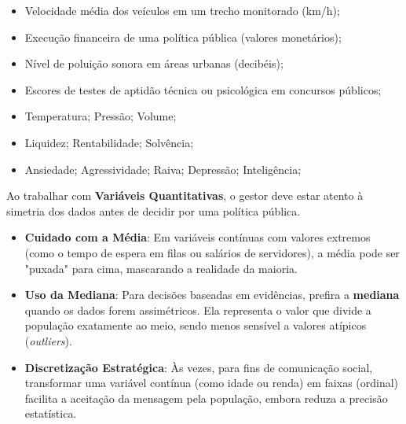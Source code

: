 \begin{enumerate}
\begin{itemize}
\item Velocidade média dos veículos em um trecho monitorado (km/h);
\item Execução financeira de uma política pública (valores monetários);
\item Nível de poluição sonora em áreas urbanas (decibéis);
\item Escores de testes de aptidão técnica ou psicológica em concursos públicos;
\item Temperatura; Pressão; Volume;
\item Liquidez; Rentabilidade; Solvência;
\item Ansiedade; Agressividade; Raiva; Depressão; Inteligência;
\end{itemize}
\end{enumerate}

\vskip0.3cm

\begin{tcolorbox}[colback=green!5,colframe=green!40!black,title= Dica para a Tomada de Decisão: O Mito da Média]
Ao trabalhar com \textbf{Variáveis Quantitativas}, o gestor deve estar atento à simetria dos dados antes de decidir por uma política pública. 

\begin{itemize}
    \item \textbf{Cuidado com a Média}: Em variáveis contínuas com valores extremos (como o tempo de espera em filas ou salários de servidores), a média pode ser "puxada" para cima, mascarando a realidade da maioria.
    \item \textbf{Uso da Mediana}: Para decisões baseadas em evidências, prefira a \textbf{mediana} quando os dados forem assimétricos. Ela representa o valor que divide a população exatamente ao meio, sendo menos sensível a valores atípicos (\textit{outliers}).
    \item \textbf{Discretização Estratégica}: Às vezes, para fins de comunicação social, transformar uma variável contínua (como idade ou renda) em faixas (ordinal) facilita a aceitação da mensagem pela população, embora reduza a precisão estatística.
\end{itemize}
\end{tcolorbox}




\newpage
